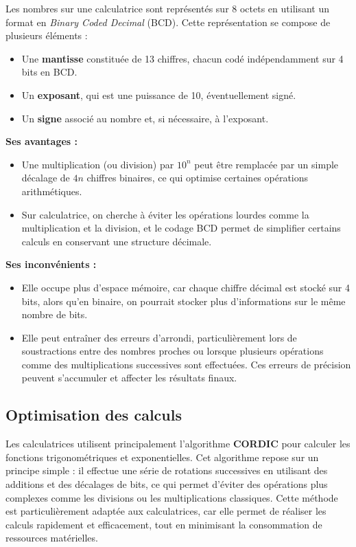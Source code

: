\documentclass{article}
\begin{document}
Les nombres sur une calculatrice sont représentés sur 8 octets en utilisant un format en \textit{Binary Coded Decimal} (BCD). Cette représentation se compose de plusieurs éléments :
\begin{itemize}
    \item Une \textbf{mantisse} constituée de 13 chiffres, chacun codé indépendamment sur 4 bits en BCD.
    \item Un \textbf{exposant}, qui est une puissance de 10, éventuellement signé.
    \item Un \textbf{signe} associé au nombre et, si nécessaire, à l’exposant.
\end{itemize}

\textbf{Ses avantages : } 
\begin{itemize}
    \item Une multiplication (ou division) par $10^n$ peut être remplacée par un simple décalage de $4n$ chiffres binaires, ce qui optimise certaines opérations arithmétiques.
    \item Sur calculatrice, on cherche à éviter les opérations lourdes comme la multiplication et la division, et le codage BCD permet de simplifier certains calculs en conservant une structure décimale.
\end{itemize}

\textbf{Ses inconvénients :  } 
\begin{itemize}
    \item Elle occupe plus d'espace mémoire, car chaque chiffre décimal est stocké sur 4 bits, alors qu'en binaire, on pourrait stocker plus d'informations sur le même nombre de bits.
    \item Elle peut entraîner des erreurs d’arrondi, particulièrement lors de soustractions entre des nombres proches ou lorsque plusieurs opérations comme des multiplications successives sont effectuées. Ces erreurs de précision peuvent s'accumuler et affecter les résultats finaux.
\end{itemize}


\subsection{Optimisation des calculs}
Les calculatrices utilisent principalement l'algorithme \textbf{CORDIC} pour calculer les fonctions trigonométriques et exponentielles. Cet algorithme repose sur un principe simple : il effectue une série de rotations successives en utilisant des additions et des décalages de bits, ce qui permet d'éviter des opérations plus complexes comme les divisions ou les multiplications classiques. Cette méthode est particulièrement adaptée aux calculatrices, car elle permet de réaliser les calculs rapidement et efficacement, tout en minimisant la consommation de ressources matérielles.
\end{document}
